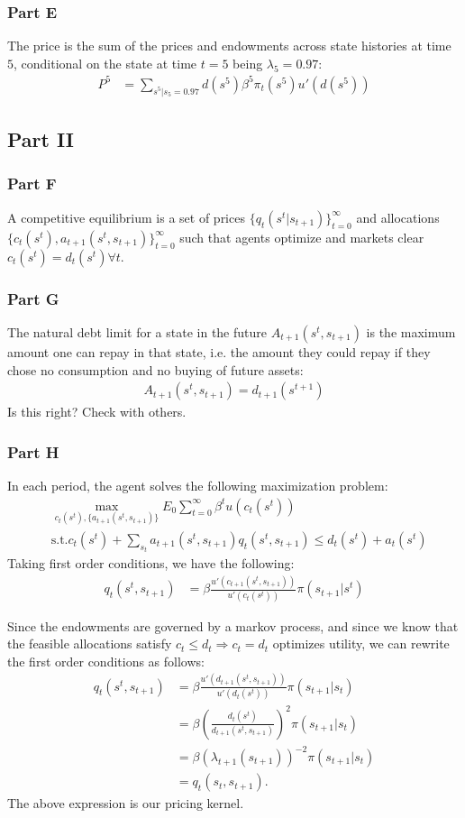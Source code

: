 \documentclass[11pt]{article} %
\begin{document}
\subsubsection{Part E}
The price is the sum of the prices and endowments across state histories at time $5$, conditional on the state at time $t=5$ being $\lambda_5 = 0.97$:
\begin{align*}
P^5 &= \sum_{s^5|s_5= 0.97} d(s^5)\beta^5 \pi_t(s^5)u'(d(s^5))
\end{align*}
\subsection{Part II}
\subsubsection{Part F}
A competitive equilibrium is a set of prices $\{q_t(s^t|s_{t+1})\}_{t=0}^{\infty}$ and allocations $\{ c_t(s^t),a_{t+1}(s^t,s_{t+1})  \}_{t=0}^{\infty}$ such that agents optimize and markets clear $c_t(s^t)  = d_t(s^t) \forall t.$
\subsubsection{Part G}
The natural debt limit for a state in the future $A_{t+1}(s^t,s_{t+1})$ is the maximum amount one can repay in that state, i.e. the amount they could repay if they chose no consumption and no buying of future assets:
\begin{align*}
A_{t+1}(s^t,s_{t+1}) = d_{t+1}(s^{t+1})
\end{align*}
Is this right? Check with others.
\subsubsection{Part H}
In each period, the agent solves the following maximization problem: 
\begin{align*}
&\max_{c_t(s^t),\{a_{t+1}(s^t,s_{t+1})\}} E_0\sum_{t=0}^{\infty} \beta^t u(c_t(s^t))\\
&\text{s.t.} c_t(s^t) + \sum_{s_t}a_{t+1}(s^t,s_{t+1})q_t(s^t,s_{t+1}) \leq d_{t}(s^t) + a_t(s^t)
\end{align*}
Taking first order conditions, we have the following:
\begin{align*}
q_t(s^t,s_{t+1}) &= \beta \frac{u'(c_{t+1}(s^t,s_{t+1}))}{u'(c_t(s^t))}\pi(s_{t+1}|s^t)
\end{align*}

Since the endowments are governed by a markov process, and since we know that the feasible allocations satisfy $c_t \leq d_t \Rightarrow c_t = d_t$ optimizes utility, we can rewrite the first order conditions as follows:
\begin{align*}
q_t(s^t,s_{t+1}) &= \beta \frac{u'(d_{t+1}(s^t,s_{t+1}))}{u'(d_t(s^t))}\pi(s_{t+1}|s_t)\\
&= \beta \left(\frac{d_t(s^t)}{d_{t+1}(s^t,s_{t+1})}\right)^2 \pi(s_{t+1}|s_t)\\
&= \beta (\lambda_{t+1}(s_{t+1}))^{-2}\pi(s_{t+1}|s_t)\\
&= q_t(s_t,s_{t+1}).
\end{align*}
The above expression is our pricing kernel.
\end{document}
